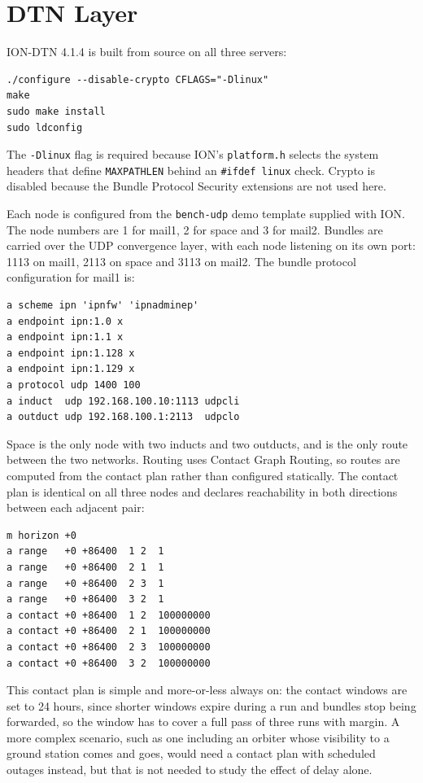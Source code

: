 \section{DTN Layer}

ION-DTN 4.1.4 is built from source on all three servers:

\begin{lstlisting}
./configure --disable-crypto CFLAGS="-Dlinux"
make
sudo make install
sudo ldconfig
\end{lstlisting}

The \texttt{-Dlinux} flag is required because ION's \texttt{platform.h} selects the
system headers that define \texttt{MAXPATHLEN} behind an \texttt{\#ifdef linux}
check. Crypto is disabled because the Bundle Protocol Security extensions are not
used here.

Each node is configured from the \texttt{bench-udp} demo template supplied with ION.
The node numbers are 1 for mail1, 2 for space and 3 for mail2. Bundles are carried
over the UDP convergence layer, with each node listening on its own port: 1113 on
mail1, 2113 on space and 3113 on mail2. The bundle protocol configuration for mail1
is:

\begin{lstlisting}
a scheme ipn 'ipnfw' 'ipnadminep'
a endpoint ipn:1.0 x
a endpoint ipn:1.1 x
a endpoint ipn:1.128 x
a endpoint ipn:1.129 x
a protocol udp 1400 100
a induct  udp 192.168.100.10:1113 udpcli
a outduct udp 192.168.100.1:2113  udpclo
\end{lstlisting}

Space is the only node with two inducts and two outducts, and is the only route
between the two networks. Routing uses Contact Graph Routing, so routes are computed
from the contact plan rather than configured statically. The contact plan is
identical on all three nodes and declares reachability in both directions between
each adjacent pair:

\begin{lstlisting}
m horizon +0
a range   +0 +86400  1 2  1
a range   +0 +86400  2 1  1
a range   +0 +86400  2 3  1
a range   +0 +86400  3 2  1
a contact +0 +86400  1 2  100000000
a contact +0 +86400  2 1  100000000
a contact +0 +86400  2 3  100000000
a contact +0 +86400  3 2  100000000
\end{lstlisting}

This contact plan is simple and more-or-less always on: the contact windows are set to 24 hours, since shorter windows expire during a run and bundles stop being forwarded, so the window has to cover a full pass of three runs with margin. A more complex scenario, such as one including an orbiter whose visibility to a ground station comes and goes, would need a contact plan with scheduled outages instead, but that is not needed to study the effect of delay alone.

